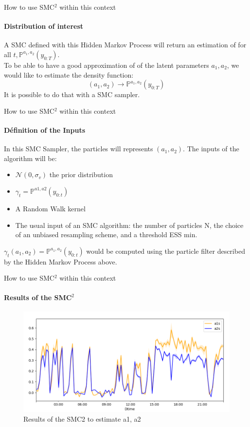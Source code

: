 \documentclass[dvipsnames, handout]{beamer}
\begin{document}
\begin{frame}{How to use SMC$^2$ within this context}
\framesubtitle{Distribution of interest}

A SMC defined with this Hidden Markov Process will return an estimation of for all $t, \mathbb{P}^{a_1,a_2}(y_{0:T})$.
\newline
\\
To be able to have a good approximation of  of the latent parameters $a_1, a_2$, we would like to estimate the density function:
$$
(a_1, a_2) \xrightarrow{} \mathbb{P}^{a_1,a_2}(y_{0:T})
$$
It is possible to do that with a SMC sampler.

\end{frame}


\begin{frame}{How to use SMC$^2$ within this context}
\framesubtitle{Définition of the Inputs}
In this SMC Sampler, the particles will represents $(a_1, a_2)$. The inputs of the algorithm will be:\\
\begin{itemize}
    \item $\mathcal{N}(0, \sigma_v)$ the prior distribution
    \item $\gamma_t= \mathbb{P}^{a1,a2}(y_{0:t})$
    \item A Random Walk kernel
    \item The usual input of an SMC algorithm: the number of particles N, the
        choice of an unbiased resampling scheme, and a threshold ESS min.
\end{itemize}

$\gamma_t(a_1, a_2) = \mathbb{P}^{a_1,a_2}(y_{0:t})$ would be computed using the particle filter described by the Hidden Markov Process above.
\newline
\\
\end{frame}

\begin{frame}{How to use SMC$^2$ within this context}
\framesubtitle{Results of the SMC$^2$}
\begin{figure}
\centering
    \centering
    \includegraphics[width=\linewidth]{Screenshot from 2023-01-05 23-14-51.png}
    \caption{Results of the SMC2 to estimate a1, a2}
    \label{fig:smc2_results}
\end{figure}
\end{frame}
\end{document}
